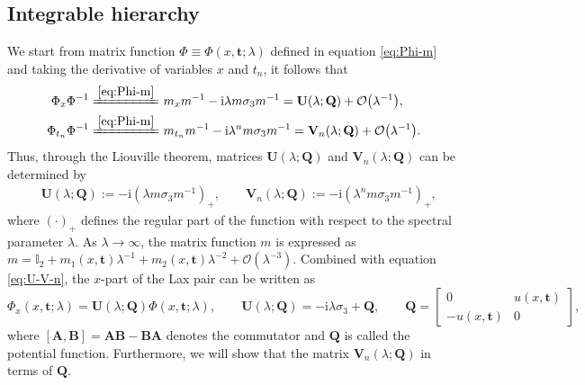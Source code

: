 \documentclass[11pt,reqno]{amsart}
\newcommand{\ii}{\mathrm{i}}
\numberwithin{equation}{section}
\begin{document}
 

\subsection{Integrable hierarchy}\label{sec:Preliminaries}
We start from matrix function $\Phi \equiv \Phi(x,\mathbf{t};\lambda)$ defined in equation \eqref{eq:Phi-m} and taking the derivative of variables $x$ and $t_n$, it follows that
\begin{equation}\label{eq:Lax-ti-x-part}
	\begin{split}
		\Phi_{x}\Phi^{-1}
		\xlongequal{\eqref{eq:Phi-m}} &\ m_{x}m^{-1}-\ii \lambda  m\sigma_3m^{-1}
		= \mathbf{U}(\lambda;\mathbf{Q})+\mathcal{O}\big(\lambda^{-1}\big),\\
		\Phi_{t_n}\Phi^{-1}
		\xlongequal{\eqref{eq:Phi-m}} &\ m_{t_n}m^{-1}-\ii \lambda^{n} m\sigma_3m^{-1}
		= \mathbf{V}_{n}(\lambda;\mathbf{Q})+\mathcal{O}\big(\lambda^{-1}\big).
	\end{split}
\end{equation}
 Thus, through the Liouville theorem, matrices $\mathbf{U}(\lambda;\mathbf{Q})$ and $\mathbf{V}_n(\lambda;\mathbf{Q})$ can be determined by
\begin{equation}\label{eq:U-V-n}
	\begin{split}
		& \mathbf{U}(\lambda;\mathbf{Q})
		:=-\ii( \lambda  m\sigma_3m^{-1})_{+},  \qquad
		\mathbf{V}_n(\lambda;\mathbf{Q})
		:=-\ii( \lambda^{n} m\sigma_3m^{-1})_{+},
	\end{split}
\end{equation}
where $(\cdot)_{+}$ defines the regular part of the function with respect to the spectral parameter $\lambda$. 
As $\lambda\rightarrow \infty$, the matrix function $m$ is expressed as $m=\mathbb{I}_2+m_1(x,\mathbf{t})\lambda^{-1}+m_2(x,\mathbf{t})\lambda^{-2}+\mathcal{O}(\lambda^{-3})$. Combined with equation \eqref{eq:U-V-n}, the $x$-part of the Lax pair can be written as
\begin{equation}\label{eq:Lax-x-part}
	\Phi_x(x,\mathbf{t};\lambda)=\mathbf{U}(\lambda;\mathbf{Q}) \Phi(x,\mathbf{t};\lambda), \qquad \mathbf{U}(\lambda;\mathbf{Q})=-\ii \lambda \sigma_3 +\mathbf{Q}, \qquad 
	\mathbf{Q}
	=\begin{bmatrix}
		0 &  u(x,\mathbf{t}) \\  -u(x,\mathbf{t}) & 0
	\end{bmatrix},
\end{equation}
where $\left[\mathbf{A},\mathbf{B}\right]=\mathbf{AB}-\mathbf{BA}$ denotes the commutator and $\mathbf{Q}$ is called the potential function. Furthermore, we will show that the matrix $\mathbf{V}_n(\lambda;\mathbf{Q})$ in terms of $\mathbf{Q}$.
\end{document}
